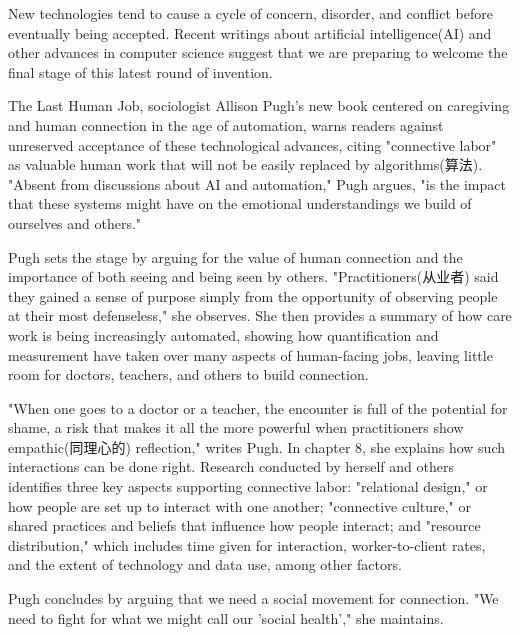 \documentclass{英语试卷}
\begin{document}
\par New technologies tend to cause a cycle of concern, disorder, and conflict before eventually being accepted. Recent writings about artificial intelligence(AI) and other advances in computer science suggest that we are preparing to welcome the final stage of this latest round of invention.\par
\par The Last Human Job, sociologist Allison Pugh's new book centered on caregiving and human connection in the age of automation, warns readers against unreserved acceptance of these technological advances, citing "connective labor" as valuable human work that will not be easily replaced by algorithms(算法). "Absent from discussions about AI and automation," Pugh argues, "is the impact that these systems might have on the emotional understandings we build of ourselves and others."\par
\par Pugh sets the stage by arguing for the value of human connection and the importance of both seeing and being seen by others. "Practitioners(从业者) said they gained a sense of purpose simply from the opportunity of observing people at their most defenseless," she observes. She then provides a summary of how care work is being increasingly automated, showing how quantification and measurement have taken over many aspects of human-facing jobs, leaving little room for doctors, teachers, and others to build connection.\par
\par "When one goes to a doctor or a teacher, the encounter is full of the potential for shame, a risk that makes it all the more powerful when practitioners show empathic(同理心的) reflection," writes Pugh. In chapter 8, she explains how such interactions can be done right. Research conducted by herself and others identifies three key aspects supporting connective labor: "relational design," or how people are set up to interact with one another; "connective culture," or shared practices and beliefs that influence how people interact; and "resource distribution," which includes time given for interaction, worker-to-client rates, and the extent of technology and data use, among other factors.\par
\par Pugh concludes by arguing that we need a social movement for connection. "We need to fight for what we might call our 'social health'," she maintains.\par
\end{document}
